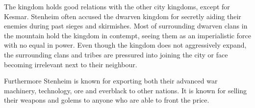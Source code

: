 The kingdom holds good relations with the other city kingdoms, except for
Kesmar. Stenheim often accused the dwarven kingdom for secretly aiding their
enemies during past sieges and skirmishes. Most of surrounding dwarven clans
in the mountain hold the kingdom in contempt, seeing them as an imperialistic
force with no equal in power. Even though the kingdom does not aggressively
expand, the surrounding clans and tribes are pressured into joining the city
or face becoming irrelevant next to their neighbour.

Furthermore Stenheim is known for exporting both their advanced war machinery,
technology, ore and everblack to other nations. It is known for selling their
weapons and golems to anyone who are able to front the price.
